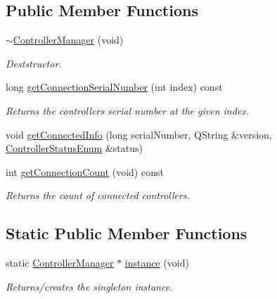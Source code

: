 \subsection*{Public Member Functions}
\begin{DoxyCompactItemize}
\item 
\mbox{\label{class_controller_manager_a74516f22a00c40a20dbd08ffcd8777d6}} 
\hyperlink{class_controller_manager_a74516f22a00c40a20dbd08ffcd8777d6}{$\sim$\+Controller\+Manager} (void)
\begin{DoxyCompactList}\small\item\em Deststructor. \end{DoxyCompactList}\item 
\mbox{\label{class_controller_manager_a140123d13332dba6947846924c666714}} 
long \hyperlink{class_controller_manager_a140123d13332dba6947846924c666714}{get\+Connection\+Serial\+Number} (int index) const
\begin{DoxyCompactList}\small\item\em Returns the controller\textquotesingle{}s serial number at the given index. \end{DoxyCompactList}\item 
void \hyperlink{class_controller_manager_a09aae80f5783ab2cb0da0ba39144ddf6}{get\+Connected\+Info} (long serial\+Number, Q\+String \&version, \hyperlink{_global_defs_8h_a51207b6a49e0da6f9978a3019d93480a}{Controller\+Status\+Enum} \&status)
\item 
\mbox{\label{class_controller_manager_ae195bc494eb3d3afeabc4e71471497d3}} 
int \hyperlink{class_controller_manager_ae195bc494eb3d3afeabc4e71471497d3}{get\+Connection\+Count} (void) const
\begin{DoxyCompactList}\small\item\em Returns the count of connected controllers. \end{DoxyCompactList}\end{DoxyCompactItemize}
\subsection*{Static Public Member Functions}
\begin{DoxyCompactItemize}
\item 
\mbox{\label{class_controller_manager_a3f4999812436ab587f8ec2ee11128c51}} 
static \hyperlink{class_controller_manager}{Controller\+Manager} $\ast$ \hyperlink{class_controller_manager_a3f4999812436ab587f8ec2ee11128c51}{instance} (void)
\begin{DoxyCompactList}\small\item\em Returns/creates the singleton instance. \end{DoxyCompactList}\end{DoxyCompactItemize}
